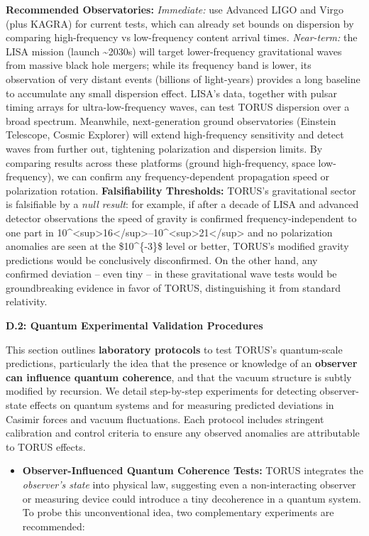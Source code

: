 \documentclass[]{article}
\begin{document}
{\textbf{Recommended Observatories:} \emph{Immediate:} use Advanced LIGO
and Virgo (plus KAGRA) for current tests, which can already set bounds
on dispersion by comparing high-frequency vs low-frequency content
arrival times​. \emph{Near-term:} the LISA mission (launch
\textasciitilde{}2030s) will target lower-frequency gravitational waves
from massive black hole mergers; while its frequency band is lower, its
observation of very distant events (billions of light-years) provides a
long baseline to accumulate any small dispersion effect​. LISA's data,
together with pulsar timing arrays for ultra-low-frequency waves, can
test TORUS dispersion over a broad spectrum. Meanwhile, next-generation
ground observatories (Einstein Telescope, Cosmic Explorer) will extend
high-frequency sensitivity and detect waves from further out, tightening
polarization and dispersion limits. By comparing results across these
platforms (ground high-frequency, space low-frequency), we can confirm
any frequency-dependent propagation speed or polarization rotation.
\textbf{Falsifiability Thresholds:} TORUS's gravitational sector is
falsifiable by a \emph{null result}: for example, if after a decade of
LISA and advanced detector observations the speed of gravity is
confirmed frequency-independent to one part in
10\^{}\textless{}sup\textgreater{}16\textless{}/sup\textgreater{}--10\^{}\textless{}sup\textgreater{}21\textless{}/sup\textgreater{}
and no polarization anomalies are seen at the \$10\^{}\{-3\}\$ level or
better, TORUS's modified gravity predictions would be conclusively
disconfirmed​. On the other hand, any confirmed deviation -- even tiny
-- in these gravitational wave tests would be groundbreaking evidence in
favor of TORUS, distinguishing it from standard relativity.

\textbf{D.2: Quantum Experimental Validation Procedures}

This section outlines \textbf{laboratory protocols} to test TORUS's
quantum-scale predictions, particularly the idea that the presence or
knowledge of an \textbf{observer can influence quantum coherence}, and
that the vacuum structure is subtly modified by recursion. We detail
step-by-step experiments for detecting observer-state effects on quantum
systems and for measuring predicted deviations in Casimir forces and
vacuum fluctuations. Each protocol includes stringent calibration and
control criteria to ensure any observed anomalies are attributable to
TORUS effects.

\begin{itemize}
\item
  \textbf{Observer-Influenced Quantum Coherence Tests:} TORUS integrates
  the \emph{observer's state} into physical law, suggesting even a
  non-interacting observer or measuring device could introduce a tiny
  decoherence in a quantum system​. To probe this unconventional idea,
  two complementary experiments are recommended:
\end{itemize}

}
\end{document}
